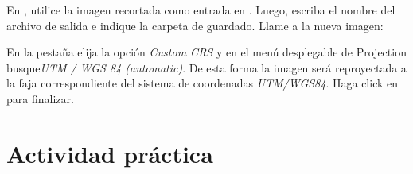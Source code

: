 En , utilice la imagen recortada como entrada en . Luego, escriba el nombre del archivo de salida e indique la carpeta de guardado. Llame a la nueva imagen:

\begin{center}
\end{center}

En la pestaña  elija la opción \emph{Custom CRS} y en el menú desplegable de Projection busque\emph{UTM / WGS 84 (automatic)}. De esta forma la imagen será reproyectada a la faja correspondiente del sistema de coordenadas \emph{UTM/WGS84}. Haga click en  para finalizar.

\section{Actividad práctica}

